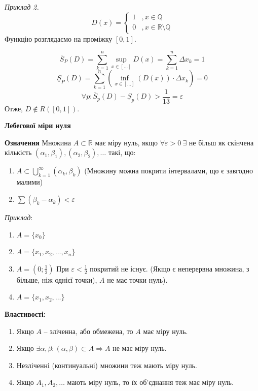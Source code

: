 \documentclass[12pt]{report}
\begin{document}
	\textit{Приклад 2.}
	$$D(x) =  \begin{cases} 1 &, x \in \mathbb{Q} \\
	0 &, x \in \mathbb{R} \setminus \mathbb{Q} \end{cases}$$
	Функцію розглядаємо на проміжку $[0,1]$.
	
	$$\overline S_{P} (D) = \sum_{k=1}^n \sup_{x \in [\ldots]} D(x) = \sum_{k=1}^n \Delta x_k = 1$$
	$$\underline S_{P} (D) = \sum_{k=1}^n( \inf_{x \in [\ldots]} (D(x)) \cdot  \Delta x_k) = 0$$
	$$\forall p : \overline S_{p}(D) - \underline S_{p} (D) > \frac{1}{13} =  \varepsilon$$
	Отже, $D \notin R([0,1])$.
	
	\begin{center}
		\textbf{ Лебегової міри нуля} 
	\end{center}
	
	\textbf{Означення} Множина $A \subset \mathbb{R}$ має міру нуль, якщо $\forall \varepsilon > 0 \ \exists$ не більш як скінчена кількість $ (\alpha_1,\beta_1), (\alpha_2,\beta_2), \ldots$ такі, що:
	
	\begin{enumerate}
		
		\item $A \subset \bigcup_{k=1}^{\infty} (\alpha_k, \beta_k)$ (Множину можна покрити інтервалами, що є завгодно малими)
		
		\item $\sum (\beta_k - \alpha_k) < \varepsilon$
		
	\end{enumerate}
	
	\textit{Приклад}:
	
	\begin{enumerate}
		
		\item $A = \{ x_0\}$
		\item $A = \{ x_1, x_2, \ldots, x_n\}$
		\item $A = (0; \frac{1}{2})$ При $\varepsilon < \frac{1}{2}$ покритий не існує. (Якщо є неперервна множина, з більше, ніж однієї точки), $A$ не має точки нуль).
		\item $A = \{ x_1, x_2, \ldots\}$
	\end{enumerate}
	
	\textbf{Властивості:}
	
	\begin{enumerate}
		
		\item Якщо $A$ -- зліченна, або обмежена, то $A$ має міру нуль.
		\item Якщо $\exists \alpha, \beta : (\alpha, \beta) \subset A \Longrightarrow A$ не має міру нуль.
		\item Незліченні (континуальні) множини теж мають міру нуль.
		\item Якщо $A_1, A_2, \ldots$ мають міру нуль, то їх об'єднання теж має міру нуль.  
		
	\end{enumerate}
	
\end{document}
